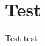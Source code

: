 \documentclass[nohangbib]{ui1activity}
\begin{document}
\section{Test}
Test test \cite{sample}\nocite{ley1987}
\makebibliography
\end{document}
